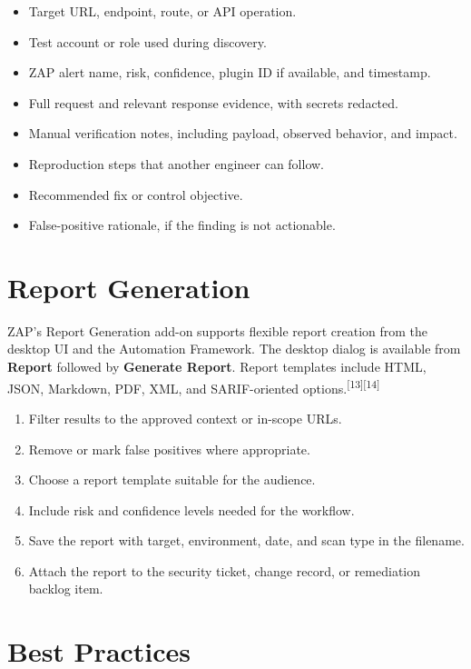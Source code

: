\documentclass[11pt]{article}
\providecommand{\term}[1]{\textbf{#1}}
\newcommand{\source}[1]{\textsuperscript{[#1]}}
\begin{document}
\begin{itemize}
  \item Target URL, endpoint, route, or API operation.
  \item Test account or role used during discovery.
  \item ZAP alert name, risk, confidence, plugin ID if available, and timestamp.
  \item Full request and relevant response evidence, with secrets redacted.
  \item Manual verification notes, including payload, observed behavior, and impact.
  \item Reproduction steps that another engineer can follow.
  \item Recommended fix or control objective.
  \item False-positive rationale, if the finding is not actionable.
\end{itemize}

\section{Report Generation}

ZAP's Report Generation add-on supports flexible report creation from the desktop UI and the Automation Framework. The desktop dialog is available from \term{Report} followed by \term{Generate Report}. Report templates include HTML, JSON, Markdown, PDF, XML, and SARIF-oriented options.\source{13}\source{14}

\begin{enumerate}
  \item Filter results to the approved context or in-scope URLs.
  \item Remove or mark false positives where appropriate.
  \item Choose a report template suitable for the audience.
  \item Include risk and confidence levels needed for the workflow.
  \item Save the report with target, environment, date, and scan type in the filename.
  \item Attach the report to the security ticket, change record, or remediation backlog item.
\end{enumerate}

\section{Best Practices}
\end{document}
